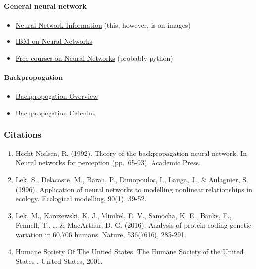 \documentclass[
]{article}
\providecommand{\tightlist}{%
  \setlength{\itemsep}{0pt}\setlength{\parskip}{0pt}}
\begin{document}
\hypertarget{general-neural-network}{%
\paragraph{General neural network}\label{general-neural-network}}

\begin{itemize}
\tightlist
\item
  \href{https://www.youtube.com/watch?v=oV3ZY6tJiA0}{Neural Network
  Information} (this, however, is on images)
\item
  \href{https://www.ibm.com/cloud/learn/neural-networks}{IBM on Neural
  Networks}
\item
  \href{https://www.edx.org/learn/neural-network}{Free courses on Neural
  Networks} (probably python)
\end{itemize}

\hypertarget{backpropogation}{%
\paragraph{Backpropogation}\label{backpropogation}}

\begin{itemize}
\tightlist
\item
  \href{https://www.youtube.com/watch?v=Ilg3gGewQ5U}{Backpropogation
  Overview}
\item
  \href{https://www.youtube.com/watch?v=tIeHLnjs5U8}{Backpropogation
  Calculus}
\end{itemize}

\hypertarget{citations}{%
\subsubsection{Citations}\label{citations}}

\begin{enumerate}
\def\labelenumi{\arabic{enumi}.}
\tightlist
\item
  Hecht-Nielsen, R. (1992). Theory of the backpropagation neural
  network. In Neural networks for perception (pp.~65-93). Academic
  Press.
\item
  Lek, S., Delacoste, M., Baran, P., Dimopoulos, I., Lauga, J., \&
  Aulagnier, S. (1996). Application of neural networks to modelling
  nonlinear relationships in ecology. Ecological modelling, 90(1),
  39-52.
\item
  Lek, M., Karczewski, K. J., Minikel, E. V., Samocha, K. E., Banks, E.,
  Fennell, T., \ldots{} \& MacArthur, D. G. (2016). Analysis of
  protein-coding genetic variation in 60,706 humans. Nature, 536(7616),
  285-291.
\item
  Humane Society Of The United States. The Humane Society of the United
  States . United States, 2001.
\end{enumerate}
\end{document}
